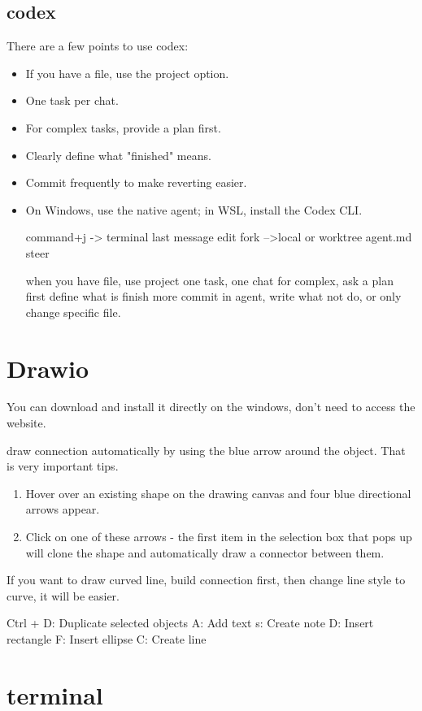\documentclass[paper=8.5in:11in, twoside, 12pt, pagesize=pdftex]{book}
\begin{document}
\subsection{codex}
There are a few points to use codex:
\begin{itemize}
	\item If you have a file, use the project option.
	\item One task per chat.
	\item For complex tasks, provide a plan first.
	\item Clearly define what "finished" means.
	\item Commit frequently to make reverting easier.
	\item On Windows, use the native agent; in WSL, install the Codex CLI.
	
	command+j -> terminal
	last message edit
	fork -->local or worktree
	agent.md
	steer
	
	
	when you have file, use project
	one task, one chat
	for complex, ask a plan first
	define what is finish
	more commit
	in agent, write what not do, or only change specific file. 
\end{itemize}


\section{Drawio}
You can download and install it directly on the windows, don't need to access the website. 

draw connection automatically by using the blue arrow around the object. That is very important tips.  

\begin{enumerate}
	\item Hover over an existing shape on the drawing canvas and four blue directional arrows appear.
	
	\item Click on one of these arrows - the first item in the selection box that pops up will clone the shape and automatically draw a connector between them.
\end{enumerate}

If you want to draw curved line, build connection first, then change line style to curve, it will be easier. 

Ctrl + D: Duplicate selected objects
A: Add text
s: Create note
D: Insert rectangle
F: Insert ellipse
C: Create line


\section{terminal}
\end{document}
